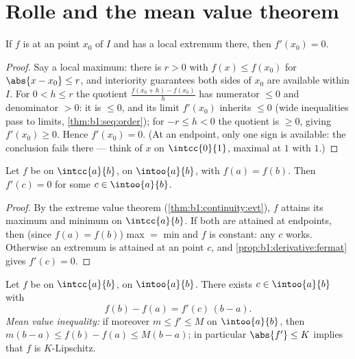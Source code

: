 \section{Rolle and the mean value theorem}

\begin{proposition}\label{prop:b1:derivative:fermat}
If $f$ is  at an \emph{} point $x_0$ of $I$ and
has a local extremum there, then $f'(x_0) = 0$.
\end{proposition}

\begin{proof}
Say a local maximum: there is $r > 0$ with $f(x) \leq f(x_0)$
for $\abs{x - x_0} \leq r$, and interiority guarantees both
sides of $x_0$ are available within $I$. For $0 < h \leq r$ the
quotient $\frac{f(x_0 + h) - f(x_0)}{h}$ has numerator $\leq 0$
and denominator $> 0$: it is $\leq 0$, and its limit $f'(x_0)$
inherits $\leq 0$ (wide inequalities pass to limits,
\cref{thm:b1:seq:order}); for $-r \leq h < 0$ the quotient is
$\geq 0$, giving $f'(x_0) \geq 0$. Hence $f'(x_0) = 0$. (At an
endpoint, only one sign is available: the conclusion fails there ---
think of $x$ on $\intcc{0}{1}$, maximal at $1$ with 
$1$.)
\end{proof}

\begin{theorem}[Rolle]\label{thm:b1:derivative:rolle}
Let $f$ be  on $\intcc{a}{b}$,  on
$\intoo{a}{b}$, with $f(a) = f(b)$. Then $f'(c) = 0$ for some $c \in
\intoo{a}{b}$.
\end{theorem}

\begin{proof}
By the extreme value theorem (\cref{thm:b1:continuity:evt}), $f$
attains its maximum and minimum on $\intcc{a}{b}$. If both are
attained at endpoints, then (since $f(a) = f(b)$) max $=$ min and $f$
is constant: any  $c$ works. Otherwise an extremum is
attained at an  point $c$, and
\cref{prop:b1:derivative:fermat} gives $f'(c) = 0$.
\end{proof}

\begin{theorem}\label{thm:b1:derivative:mvt}
Let $f$ be  on $\intcc{a}{b}$,  on
$\intoo{a}{b}$. There exists $c \in \intoo{a}{b}$ with
\[
f(b) - f(a) = f'(c)\,(b - a) .
\]
\emph{Mean value inequality:} if moreover $m \leq f' \leq M$ on
$\intoo{a}{b}$, then $m(b-a) \leq f(b) - f(a) \leq M(b-a)$; in
particular $\abs{f'} \leq K$ implies that $f$ is $K$-Lipschitz.
\end{theorem}

